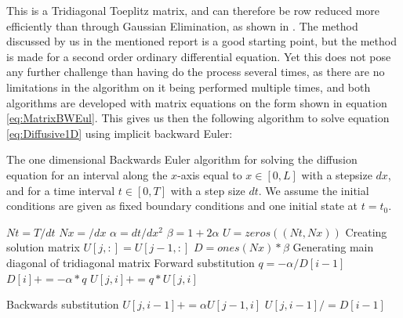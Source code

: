 \documentclass[a4paper,10pt,english]{article}
\begin{document}
This is a Tridiagonal Toeplitz matrix, and can therefore be row reduced more efficiently than through Gaussian Elimination, as shown in \cite{Rapport1}. The method discussed by us in the mentioned report is a good starting point, but the method is made for a second order ordinary differential equation. Yet this does not pose  any further challenge than having do the process several times, as there are no limitations in the algorithm on it being performed multiple times, and both algorithms are developed with matrix equations on the form shown in equation \ref{eq:MatrixBWEul}. This gives us then the following algorithm to solve equation \ref{eq:Diffusive1D} using implicit backward Euler:
\begin{algorithm}[H]
\centering
\caption{The one dimensional Backwards Euler algorithm for solving the diffusion equation for an interval along the $x$-axis equal to $x \in [0,L]$ with a stepsize $dx$, and for a time interval $t \in [0,T]$ with a step size $dt$. We assume the initial conditions are given as fixed boundary conditions and one initial state at $t=t_0$. \label{alg:BWE_1D}}
	\begin{algorithmic}[1]
		\State $Nt = T/dt$
		\State $Nx = /dx$
		\State $\alpha = dt/dx^2$
		\State $\beta = 1 + 2\alpha$
		\State $U = zeros((Nt,Nx))$
		\Comment Creating solution matrix
			\State $U[j,:] = U[j-1,:]$
			\State $D = ones(Nx)*\beta$ \Comment Generating main diagonal of tridiagonal matrix
				\Comment Forward substitution
				\State $q = - \alpha / D[i-1]$
				\State $D[i] += -\alpha * q$
				\State $U[j,i] += q*U[j,i]$
			\EndFor

				\Comment Backwards substitution 
				\State $U[j,i-1] += \alpha U[j-1,i]$
				\State $U[j,i-1] /= D[i-1]$
			\EndFor
		\EndFor
 
	\end{algorithmic}
\end{algorithm} 
\end{document}
